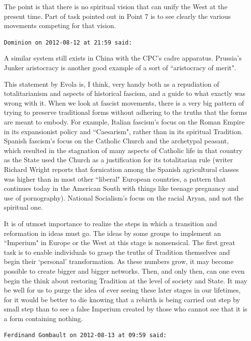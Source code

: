 \begin{footnotesize}
\begin{sffamily}
The point is that there is no spiritual vision that can unify the West at the present time. Part of task pointed out in Point 7 is to see clearly the various movements competing for that vision.


\hfill

\texttt{Dominion on 2012-08-12 at 21:59 said: }

A similar system still exists in China with the CPC's cadre apparatus. Prussia's Junker aristocracy is another good example of a sort of ``aristocracy of merit".

This statement by Evola is, I think, very handy both as a repudiation of totalitarianism and aspects of historical fascism, and a guide to what exactly was wrong with it. When we look at fascist movements, there is a very big pattern of trying to preserve traditional forms without adhering to the truths that the forms are meant to embody. For example, Italian fascism's focus on the Roman Empire in its expansionist policy and ``Caesarism", rather than in its spiritual Tradition. Spanish fascism's focus on the Catholic Church and the archetypal peasant, which resulted in the stagnation of many aspects of Catholic life in that country as the State used the Church as a justification for its totalitarian rule (writer Richard Wright reports that fornication among the Spanish agricultural classes was higher than in most other ``liberal" European countries, a pattern that continues today in the American South with things like teenage pregnancy and use of pornography). National Socialism's focus on the racial Aryan, and not the spiritual one. 

It is of utmost importance to realize the steps in which a transition and reformation in ideas must go. The ideas by some groups to implement an ``Imperium" in Europe or the West at this stage is nonsensical. The first great task is to enable individuals to grasp the truths of Tradition themselves and begin their `personal' transformation. As these numbers grow, it may become possible to create bigger and bigger networks. Then, and only then, can one even begin the think about restoring Tradition at the level of society and State. It may be well for us to purge the idea of ever seeing these later stages in our lifetimes, for it would be better to die knowing that a rebirth is being carried out step by small step than to see a false Imperium created by those who cannot see that it is a form containing nothing.


\hfill

\texttt{Ferdinand Gombault on 2012-08-13 at 09:59 said: }


\end{sffamily}
\end{footnotesize}

